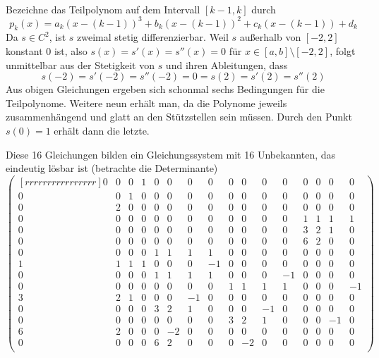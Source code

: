 \documentclass[a4paper]{scrartcl}
\begin{document}
\begin{aufgabe}~

	Bezeichne das Teilpolynom auf dem Intervall $[k-1,k]$ durch
	\[
		p_k(x) = a_k(x-(k-1))^3 + b_k(x-(k-1))^2 + c_k(x-(k-1)) + d_k
	\]
	Da $s\in C^2$, ist $s$ zweimal stetig differenzierbar.
	Weil $s$ außerhalb von $[-2,2]$ konstant $0$ ist, also $s(x)=s'(x)=s''(x)=0$ für $x\in [a,b]\setminus [-2,2]$, folgt unmittelbar aus der Stetigkeit von $s$ und ihren Ableitungen, dass
	\[
		s(-2) = s'(-2) = s''(-2) = 0 = s(2) = s'(2) = s''(2)
	\]
	Aus obigen Gleichungen ergeben sich schonmal sechs Bedingungen für die Teilpolynome.
	Weitere neun erhält man, da die Polynome jeweils zusammenhängend und glatt an den Stützstellen sein müssen.
	Durch den Punkt $s(0) = 1$ erhält dann die letzte.

	Diese 16 Gleichungen bilden ein Gleichungssystem mit 16 Unbekannten, das eindeutig lösbar ist (betrachte die Determinante)
	\setcounter{MaxMatrixCols}{16}
	\[
		\begin{pmatrix}[rrrrrrrrrrrrrrrr]
			0 & 0 & 0 & 1 & 0 & 0 & 0 & 0 & 0 & 0 & 0 & 0 & 0 & 0 & 0 & 0 \\
			0 & 0 & 1 & 0 & 0 & 0 & 0 & 0 & 0 & 0 & 0 & 0 & 0 & 0 & 0 & 0 \\
			0 & 2 & 0 & 0 & 0 & 0 & 0 & 0 & 0 & 0 & 0 & 0 & 0 & 0 & 0 & 0 \\
			0 & 0 & 0 & 0 & 0 & 0 & 0 & 0 & 0 & 0 & 0 & 0 & 1 & 1 & 1 & 1 \\
			0 & 0 & 0 & 0 & 0 & 0 & 0 & 0 & 0 & 0 & 0 & 0 & 3 & 2 & 1 & 0 \\
			0 & 0 & 0 & 0 & 0 & 0 & 0 & 0 & 0 & 0 & 0 & 0 & 6 & 2 & 0 & 0 \\
			0 & 0 & 0 & 0 & 1 & 1 & 1 & 1 & 0 & 0 & 0 & 0 & 0 & 0 & 0 & 0 \\
			1 & 1 & 1 & 1 & 0 & 0 & 0 &-1 & 0 & 0 & 0 & 0 & 0 & 0 & 0 & 0 \\
			0 & 0 & 0 & 0 & 1 & 1 & 1 & 1 & 0 & 0 & 0 &-1 & 0 & 0 & 0 & 0 \\
			0 & 0 & 0 & 0 & 0 & 0 & 0 & 0 & 1 & 1 & 1 & 1 & 0 & 0 & 0 &-1 \\
			3 & 2 & 1 & 0 & 0 & 0 &-1 & 0 & 0 & 0 & 0 & 0 & 0 & 0 & 0 & 0 \\
			0 & 0 & 0 & 0 & 3 & 2 & 1 & 0 & 0 & 0 &-1 & 0 & 0 & 0 & 0 & 0 \\
			0 & 0 & 0 & 0 & 0 & 0 & 0 & 0 & 3 & 2 & 1 & 0 & 0 & 0 &-1 & 0 \\
			6 & 2 & 0 & 0 & 0 &-2 & 0 & 0 & 0 & 0 & 0 & 0 & 0 & 0 & 0 & 0 \\
			0 & 0 & 0 & 0 & 6 & 2 & 0 & 0 & 0 &-2 & 0 & 0 & 0 & 0 & 0 & 0 \\

\end{pmatrix}\]
\end{aufgabe}
\end{document}
